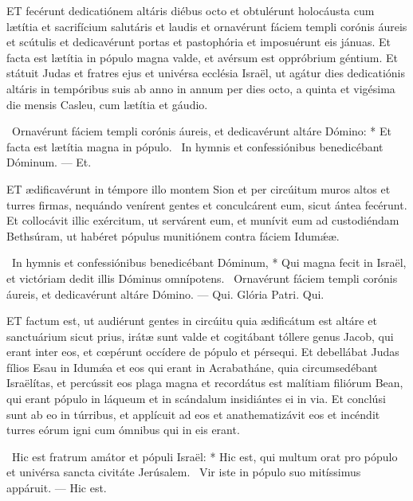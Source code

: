 \lettrine[lines=2]{E}{T} fecérunt dedicatiónem altáris diébus octo et obtulérunt holocáusta cum lætítia et sacrifícium salutáris et laudis et ornavérunt fáciem templi corónis áureis et scútulis et dedicavérunt portas et pastophória et imposuérunt eis jánuas. Et facta est lætítia in pópulo magna valde, et avérsum est oppróbrium géntium. Et státuit Judas et fratres ejus et univérsa ecclésia Israël, ut agátur dies dedicatiónis altáris in tempóribus suis ab anno in annum per dies octo, a quinta et vigésima die mensis Casleu, cum lætítia et gáudio.

\R\ Ornavérunt fáciem templi corónis áureis, et dedicavérunt altáre Dómino: * Et facta est lætítia magna in pópulo. \V\ In hymnis et confessiónibus benedicébant Dóminum. — Et.



\lettrine[lines=2]{E}{T} ædificavérunt in témpore illo montem Sion et per circúitum muros altos et turres firmas, nequándo venírent gentes et conculcárent eum, sicut ántea fecérunt. Et collocávit illic exércitum, ut servárent eum, et munívit eum ad custodiéndam Bethsúram, ut habéret pópulus munitiónem contra fáciem Idumǽæ.

\R\ In hymnis et confessiónibus benedicébant Dóminum, * Qui magna fecit in Israël, et victóriam dedit illis Dóminus omnípotens. \V\ Ornavérunt fáciem templi corónis áureis, et dedicavérunt altáre Dómino. — Qui. Glória Patri. Qui.




\lettrine[lines=2]{E}{T} factum est, ut audiérunt gentes in circúitu quia ædificátum est altáre et sanctuárium sicut prius, irátæ sunt valde et cogitábant tóllere genus Jacob, qui erant inter eos, et cœpérunt occídere de pópulo et pérsequi. Et debellábat Judas fílios Esau in Idumǽa et eos qui erant in Acrabatháne, quia circumsedébant Israëlítas, et percússit eos plaga magna et recordátus est malítiam filiórum Bean, qui erant pópulo in láqueum et in scándalum insidiántes ei in via. Et conclúsi sunt ab eo in túrribus, et applícuit ad eos et anathematizávit eos et incéndit turres eórum igni cum ómnibus qui in eis erant.

\R\ Hic est fratrum amátor et pópuli Israël: * Hic est, qui multum orat pro pópulo et univérsa sancta civitáte Jerúsalem. \V\ Vir iste in pópulo suo mitíssimus appáruit. — Hic est.

